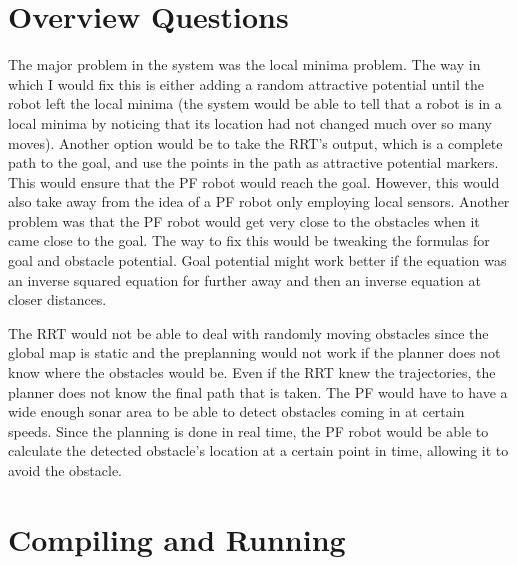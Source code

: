 \documentclass[12pt]{article}
\begin{document}
\section{Overview Questions}
The major problem in the system was the local minima problem. The way in which I would fix this is either adding a random attractive potential until the robot left the local minima (the system would be able to tell that a robot is in a local minima by noticing that its location had not changed much over so many moves). Another option would be to take the RRT's output, which is a complete path to the goal, and use the points in the path as attractive potential markers. This would ensure that the PF robot would reach the goal. However, this would also take away from the idea of a PF robot only employing local sensors. Another problem was that the PF robot would get very close to the obstacles when it came close to the goal. The way to fix this would be tweaking the formulas for goal and obstacle potential. Goal potential might work better if the equation was an inverse squared equation for further away and then an inverse equation at closer distances.

The RRT would not be able to deal with randomly moving obstacles since the global map is static and the preplanning would not work if the planner does not know where the obstacles would be. Even if the RRT knew the trajectories, the planner does not know the final path that is taken. The PF would have to have a wide enough sonar area to be able to detect obstacles coming in at certain speeds. Since the planning is done in real time, the PF robot would be able to calculate the detected obstacle's location at a certain point in time, allowing it to avoid the obstacle.

\section{Compiling and Running}
\end{document}
